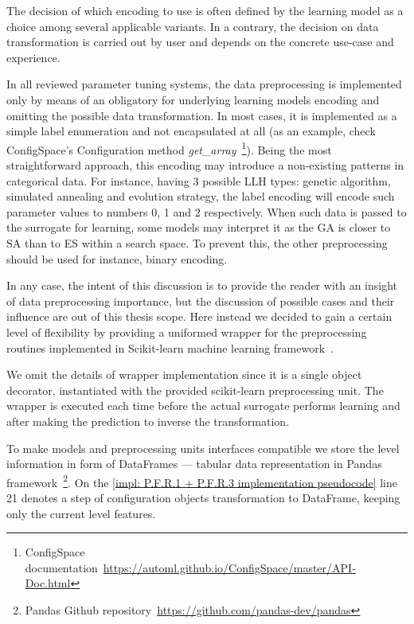 The decision of which encoding to use is often defined by the learning model as a choice among several applicable variants. In a contrary, the decision on data transformation is carried out by user and depends on the concrete use-case and experience.

In all reviewed parameter tuning systems, the data preprocessing is implemented only by means of an obligatory for underlying learning models encoding and omitting the possible data transformation. In most cases, it is implemented as a simple label enumeration and not encapsulated at all (as an example, check ConfigSpace's Configuration method \emph{get\_array}~\footnote{ConfigSpace documentation~\url{https://automl.github.io/ConfigSpace/master/API-Doc.html}}). Being the most straightforward approach, this encoding may introduce a non-existing patterns in categorical data. For instance, having 3 possible LLH types: genetic algorithm, simulated annealing and evolution strategy, the label encoding will encode such parameter values to numbers 0, 1 and 2 respectively. When such data is passed to the surrogate for learning, some models may interpret it as the GA is closer to SA than to ES within a search space. To prevent this, the other preprocessing should be used for instance, binary encoding.

In any case, the intent of this discussion is to provide the reader with an insight of data preprocessing importance, but the discussion of possible cases and their influence are out of this thesis scope. Here instead we decided to gain a certain level of flexibility by providing a uniformed wrapper for the preprocessing routines implemented in Scikit-learn machine learning framework~\cite{scikit-learn}.

We omit the details of wrapper implementation since it is a single object decorator, instantiated with the provided scikit-learn preprocessing unit. The wrapper is executed each time before the actual surrogate performs learning and after making the prediction to inverse the transformation.

To make models and preprocessing units interfaces compatible we store the level information in form of DataFrames — tabular data representation in Pandas framework~\footnote{Pandas Github repository~\url{https://github.com/pandas-dev/pandas}}. On the \cref{impl: P.F.R.1 + P.F.R.3 implementation pseudocode} line 21 denotes a step of configuration objects transformation to DataFrame, keeping only the current level features.


